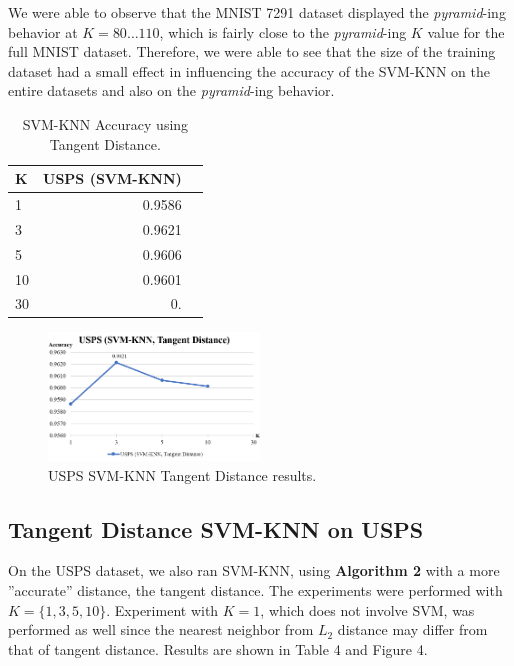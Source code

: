 \documentclass[11pt,letterpaper]{article}
\begin{document}
We were able to observe that the MNIST 7291 dataset displayed the \textit{pyramid}-ing behavior at $K=80\dots 110$, which is fairly close to the \textit{pyramid}-ing $K$ value for the full MNIST dataset. Therefore, we were able to see that the size of the training dataset had a small effect in influencing the accuracy of the SVM-KNN on the entire datasets and also on the \textit{pyramid}-ing behavior.

\begin{table}
\begin{center}
\begin{tabular}{|l|r|r|}
\hline \bf K & \bf USPS (SVM-KNN) \\ \hline
1 & 0.9586  \\
3 & 0.9621 \\
5 & 0.9606 \\
10 & 0.9601 \\
30 & 0. \\
\hline
\end{tabular}
\end{center}
\caption{\label{knn-mnist} SVM-KNN Accuracy using Tangent Distance.}
\end{table}

\begin{figure}[t!]
  \centering
  \includegraphics[keepaspectratio, width=0.5\textwidth]{usps_td.png}
  \caption{USPS SVM-KNN Tangent Distance results.}
\end{figure}

\subsection{Tangent Distance SVM-KNN on USPS}

On the USPS dataset, we also ran SVM-KNN, using \textbf{Algorithm 2} with a more ''accurate'' distance, the tangent distance. The experiments were performed with $K = \{1, 3, 5, 10\}$. Experiment with $K = 1$, which does not involve SVM, was performed as well since the nearest neighbor from $L_2$ distance may differ from that of tangent distance. Results are shown in Table 4 and Figure 4.
\end{document}
